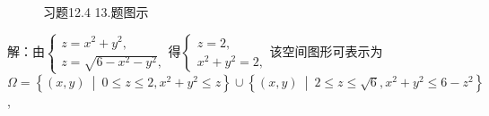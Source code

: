 \documentclass[12pt,UTF8]{ctexart}
\newcommand\Set[2]{\left\{#1\ \middle\vert\ #2 \right\}}
\begin{document}
\begin{enumerate}
\begin{figure}[H]
\begin{center}
\\
\end{center}
\caption{习题12.4 13.题图示}
\label{12-4-13}
\end{figure}

解：由$\begin{cases}
z=x^2+y^2,\\
z=\sqrt{6-x^2-y^2},
\end{cases}$得$\begin{cases}
z=2,\\
x^2+y^2=2,
\end{cases}$该空间图形可表示为\\
$\Omega=\Set{(x,y)}{0\leqslant z\leqslant2,x^2+y^2\leqslant z}\cup\Set{(x,y)}{2\leqslant z\leqslant\sqrt6,x^2+y^2\leqslant6-z^2}$,


\end{enumerate}
\end{document}
